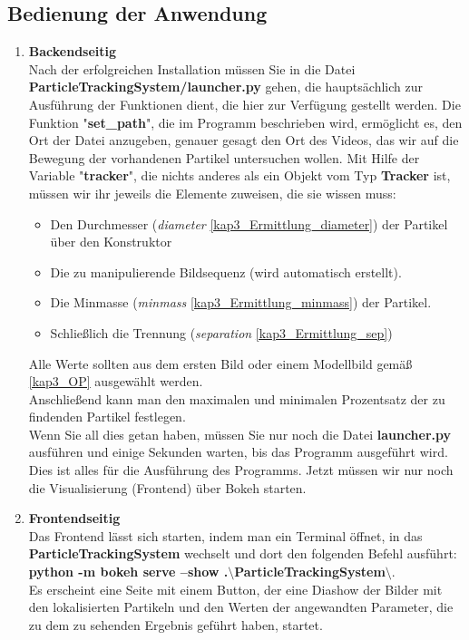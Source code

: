 \subsection{Bedienung der Anwendung}
\begin{enumerate}
	\item \textbf{Backendseitig}\\
	Nach der erfolgreichen Installation müssen Sie in die Datei \textbf{ParticleTrackingSystem/launcher.py} gehen, die hauptsächlich zur Ausführung der Funktionen dient, die hier zur Verfügung gestellt werden. Die Funktion "\textbf{set\_path}", die im Programm beschrieben wird, ermöglicht es, den Ort der Datei anzugeben, genauer gesagt den Ort des Videos, das wir auf die Bewegung der vorhandenen Partikel untersuchen wollen. 
Mit Hilfe der Variable "\textbf{tracker}", die nichts anderes als ein Objekt vom Typ \textbf{Tracker} ist, müssen wir ihr jeweils die Elemente zuweisen, die sie wissen muss:
\begin{itemize}
   \item Den Durchmesser (\textit{diameter} \ref{kap3_Ermittlung_diameter}) der Partikel über den Konstruktor
   
   \item Die zu manipulierende Bildsequenz (wird automatisch erstellt).
   
   \item Die Minmasse (\textit{minmass} \ref{kap3_Ermittlung_minmass}) der Partikel.
   
   \item Schließlich die Trennung (\textit{separation} \ref{kap3_Ermittlung_sep})
\end{itemize}

Alle Werte sollten aus dem ersten Bild oder einem Modellbild gemäß \ref{kap3_OP} ausgewählt werden.\\
Anschließend kann man den maximalen und minimalen Prozentsatz der zu findenden Partikel festlegen.\\
Wenn Sie all dies getan haben, müssen Sie nur noch die Datei \textbf{launcher.py} ausführen und einige Sekunden warten, bis das Programm ausgeführt wird. Dies ist alles für die Ausführung des Programms. Jetzt müssen wir nur noch die Visualisierung (Frontend) über Bokeh starten.
	\item \textbf{Frontendseitig}\\
	Das Frontend lässt sich starten, indem man ein Terminal öffnet, in das \textbf{ParticleTrackingSystem} wechselt und dort den folgenden Befehl ausführt:\\ \textbf{python -m bokeh serve --show .$\setminus$ParticleTrackingSystem$\setminus$}. \\ Es erscheint eine Seite mit einem Button, der eine Diashow der Bilder mit den lokalisierten Partikeln und den Werten der angewandten Parameter, die zu dem zu sehenden Ergebnis geführt haben, startet.
	

\end{enumerate}
